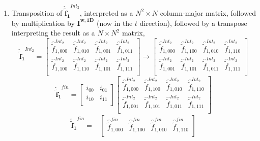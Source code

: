 \documentclass[12pt,Bold,letterpaper,TexShade]{mcgilletdclass}
\numberwithin{equation}{section}
\newcommand{\mat}[1]{\bm{{#1}}}
\newcommand{\vect}[1]{\bm{{#1}}}
\begin{document}
\begin{enumerate}
\item Transposition of $\vect{\hat{\tilde{f}}_{1}}^{Int_2}$, interpreted as a $N^2 \times N$ column-major matrix, followed by multiplication by $\mat{I^{w,1D}}$ (now in the $t$ direction), followed by a transpose interpreting the result as a $N \times N^2$ matrix,
\begin{equation} \nonumber
\vect{\hat{\tilde{f}}_{1}}^{Int_2}
=
\begin{bmatrix}
\hat{\tilde{f}}^{Int_2}_{1,000} & \hat{\tilde{f}}^{Int_2}_{1,010} & \hat{\tilde{f}}^{Int_2}_{1,001} & \hat{\tilde{f}}^{Int_2}_{1,011} \\
\hat{\tilde{f}}^{Int_2}_{1,100} & \hat{\tilde{f}}^{Int_2}_{1,110} & \hat{\tilde{f}}^{Int_2}_{1,101} & \hat{\tilde{f}}^{Int_2}_{1,111} \\
\end{bmatrix}
\rightarrow
\begin{bmatrix}
\hat{\tilde{f}}^{Int_2}_{1,000} & \hat{\tilde{f}}^{Int_2}_{1,100} & \hat{\tilde{f}}^{Int_2}_{1,010} & \hat{\tilde{f}}^{Int_2}_{1,110} \\
\hat{\tilde{f}}^{Int_2}_{1,001} & \hat{\tilde{f}}^{Int_2}_{1,101} & \hat{\tilde{f}}^{Int_2}_{1,011} & \hat{\tilde{f}}^{Int_2}_{1,111} \\
\end{bmatrix}
\end{equation}
\begin{equation} \nonumber
\vect{\hat{\tilde{f}}_{1}}^{fin}
=
\begin{bmatrix}
i_{00} & i_{01} \\
i_{10} & i_{11} \\
\end{bmatrix}
\begin{bmatrix}
\hat{\tilde{f}}^{Int_2}_{1,000} & \hat{\tilde{f}}^{Int_2}_{1,100} & \hat{\tilde{f}}^{Int_2}_{1,010} & \hat{\tilde{f}}^{Int_2}_{1,110} \\
\hat{\tilde{f}}^{Int_2}_{1,001} & \hat{\tilde{f}}^{Int_2}_{1,101} & \hat{\tilde{f}}^{Int_2}_{1,011} & \hat{\tilde{f}}^{Int_2}_{1,111} \\
\end{bmatrix}
\end{equation}
\begin{equation} \nonumber
\begin{split}
\vect{\hat{\tilde{f}}_{1}}^{fin}
= &
\begin{bmatrix}
\hat{\tilde{f}}^{fin}_{1,000} & \hat{\tilde{f}}^{fin}_{1,100} & \hat{\tilde{f}}^{fin}_{1,010} & \hat{\tilde{f}}^{fin}_{1,110} \\

\end{bmatrix}
\end{split}
\end{equation}
\end{enumerate}
\end{document}

